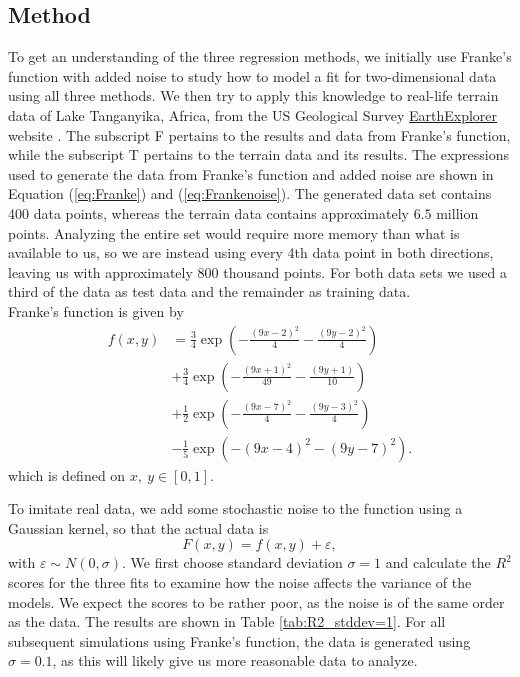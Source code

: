 \documentclass[a4paper, 10pt]{article}
\begin{document}
\begin{multicols}{2}
\section{Method}
To get an understanding of the three regression methods, we initially use Franke's function with added noise to study how to model a fit for two-dimensional data using all three methods. We then try to apply this knowledge to real-life terrain data of Lake Tanganyika, Africa, from the US Geological Survey \href{https://earthexplorer.usgs.gov/}{EarthExplorer}  website \cite{earthexplorer} .  The subscript F pertains to the results and data from Franke's function, while the subscript T pertains to the terrain data and its results.  The expressions used to generate the data from Franke's function and added noise are shown in Equation (\ref{eq:Franke}) and (\ref{eq:Frankenoise}). The generated data set contains 400 data points, whereas the terrain data contains approximately $6.5$ million points. Analyzing the entire set would require more memory than what is available to us, so we are instead using every 4th data point in both directions, leaving us with approximately 800 thousand points.  For both data sets we used a third of the data as test data and the remainder as training data.
\\
Franke's function is given by
\begin{align}
f(x,y) &= \frac{3}{4}\exp{\left(-\frac{(9x-2)^2}{4}   - \frac{(9y-2)^2}{4}\right)} \nonumber\\
 &+\frac{3}{4}\exp{\left(-\frac{(9x+1)^2}{49}- \frac{(9y+1)}{10}\right)} \nonumber\\
 &+\frac{1}{2}\exp{\left(-\frac{(9x-7)^2}{4} - \frac{(9y-3)^2}{4}\right)} \nonumber\\
 &-\frac{1}{5}\exp{\left(-(9x-4)^2 - (9y-7)^2\right) }. \label{eq:Franke}
\end{align} which is defined on $x,\ y \in [0,1]$.

To imitate real data, we add some stochastic noise to the function using a Gaussian kernel, so that the actual data is
\begin{equation}
F(x, y) = f(x, y) + \varepsilon \label{eq:Frankenoise},
\end{equation}
with $ \varepsilon \sim N(0, \sigma) $. We first choose standard deviation $\sigma=1$ and calculate the $R^2$ scores for the three fits to examine how the noise affects the variance of the models. We expect the scores to be rather poor, as the noise is of the same order as the data.  The results are shown in Table \ref{tab:R2_stddev=1}. For all subsequent simulations using Franke's function, the data is generated using $\sigma=0.1$, as this will likely give us more reasonable data to analyze.


\end{multicols}
\end{document}
